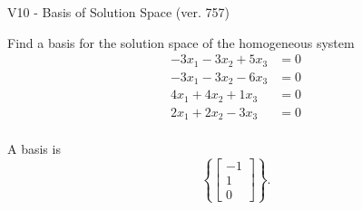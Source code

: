 \begin{exercise}
  \begin{exerciseTitle}V10 - Basis of Solution Space (ver. 757)\end{exerciseTitle}
  \begin{exerciseStatement}
    Find a basis for the solution space of the homogeneous system 
\begin{align*}
 -3 x_ 1 -3 x_ 2 + 5 x_ 3 &= 0  \\ 
  -3 x_ 1 -3 x_ 2 -6 x_ 3 &= 0  \\ 
  4 x_ 1 + 4 x_ 2 + 1 x_ 3 &= 0  \\ 
  2 x_ 1 + 2 x_ 2 -3 x_ 3 &= 0  \\ 
 \end{align*}


 
  \end{exerciseStatement}

  \begin{exerciseAnswer}
   A basis is   
\[\left\{\left[\begin{array}{c}
-1 \\
1 \\
0
\end{array}\right]\right\}.\]

  


  \end{exerciseAnswer}
\end{exercise}